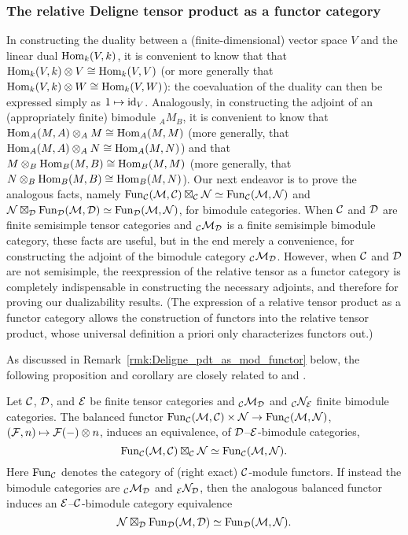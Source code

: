 \documentclass{amsart}
\begin{document}
\subsubsection{The relative Deligne tensor product as a functor category}

In constructing the duality between a (finite-dimensional) vector space $V$ and the linear dual $\operatorname{Hom}_k(V,k)$, it is convenient to know that that $\operatorname{Hom}_k(V,k) \otimes V \cong \operatorname{Hom}_k(V,V)$ (or more generally that $\operatorname{Hom}_k(V,k) \otimes W \cong \operatorname{Hom}_k(V,W)$): the coevaluation of the duality can then be expressed simply as $1 \mapsto \mathrm{id}_V$.  Analogously, in constructing the adjoint of an (appropriately finite) bimodule ${}_A M_B$, it is convenient to know that $\operatorname{Hom}_A(M,A) \otimes_A M \cong \operatorname{Hom}_A(M,M)$ (more generally, that $\operatorname{Hom}_A(M,A) \otimes_A N \cong \operatorname{Hom}_A(M,N)$) and that $M \otimes_B \operatorname{Hom}_B(M,B) \cong \operatorname{Hom}_B(M,M)$ (more generally, that $N \otimes_B \operatorname{Hom}_B(M,B) \cong \operatorname{Hom}_B(M,N)$).  Our next endeavor is to prove the analogous facts, namely $\operatorname{Fun}_\mathcal C(\mathcal M,\mathcal C) \boxtimes_\mathcal C \mathcal N \simeq \operatorname{Fun}_\mathcal C(\mathcal M,\mathcal N)$ and $\mathcal N \boxtimes_\mathcal D \operatorname{Fun}_\mathcal D(\mathcal M,\mathcal D) \simeq \operatorname{Fun}_\mathcal D(\mathcal M,\mathcal N)$, for bimodule categories.  When $\mathcal C$ and $\mathcal D$ are finite semisimple tensor categories and ${}_\mathcal C \mathcal M_\mathcal D$ is a finite semisimple bimodule category, these facts are useful, but in the end merely a convenience, for constructing the adjoint of the bimodule category ${}_\mathcal C \mathcal M_\mathcal D$.  However, when $\mathcal C$ and $\mathcal D$ are not semisimple, the reexpression of the relative tensor as a functor category is completely indispensable in constructing the necessary adjoints, and therefore for proving our dualizability results.  (The expression of a relative tensor product as a functor category allows the construction of functors into the relative tensor product, whose universal definition a priori only characterizes functors out.)

As discussed in Remark~\ref{rmk:Deligne_pdt_as_mod_functor} below, the following proposition and corollary are closely related to  \cite[Prop. 3.5 and Rmk. 3.6]{0909.3140} and \cite[Thm. 3.20]{0911.4979}.
\begin{proposition} \label{prop:FunctorsAsATensorPdt}
Let $\mathcal C$, $\mathcal D$, and $\mathcal E$ be finite tensor categories and ${}_\mathcal C \mathcal M_\mathcal D$ and ${}_\mathcal C \mathcal N_\mathcal E$ finite bimodule categories.  The balanced functor $\operatorname{Fun}_\mathcal C(\mathcal M,\mathcal C) \times \mathcal N \rightarrow \operatorname{Fun}_\mathcal C(\mathcal M,\mathcal N)$, $(\mathcal F,n) \mapsto \mathcal F(-) \otimes n$, induces an equivalence, of $\mathcal D$--$\mathcal E$-bimodule categories,
\[
		\operatorname{Fun}_\mathcal C(\mathcal M, \mathcal C) \boxtimes_\mathcal C \mathcal N \simeq \operatorname{Fun}_\mathcal C(\mathcal M,\mathcal N).
\]
Here $\operatorname{Fun}_\mathcal C$ denotes the category of (right exact) $\mathcal C$-module functors.  If instead the bimodule categories are ${}_\mathcal C \mathcal M_\mathcal D$ and ${}_\mathcal E \mathcal N_\mathcal D$, then the analogous balanced functor induces an $\mathcal E$--$\mathcal C$-bimodule category equivalence
\[
\mathcal N \boxtimes_\mathcal D \operatorname{Fun}_{\mathcal D}(\mathcal M,\mathcal D) \simeq \operatorname{Fun}_{\mathcal D}(\mathcal M,\mathcal N).
\]
\end{proposition}
\end{document}
